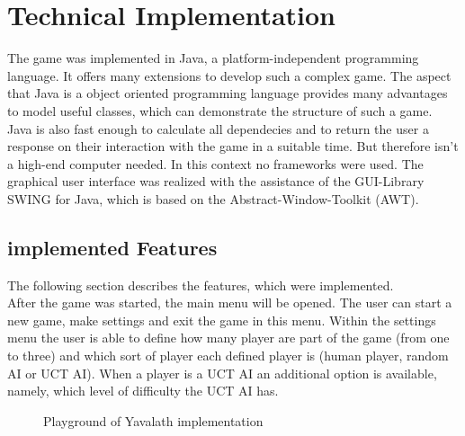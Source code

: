 \documentclass[german]{report}
\begin{document}
\chapter{Technical Implementation}
\label{sec:technImplementation}
The game was implemented in Java, a platform-independent programming language.
It offers many extensions to develop such a complex game. The aspect that Java
is a object oriented programming language provides many advantages to model
useful classes, which can demonstrate the structure of such a game. Java is also
fast enough to calculate all dependecies and to return the user a
response on their interaction with the game in a suitable time. But therefore
isn't a high-end computer needed. In this context no frameworks were used. The
graphical user interface was realized with the assistance of the GUI-Library
SWING for Java, which is based on the Abstract-Window-Toolkit (AWT).  
\section{implemented Features}
The following section describes the features, which were implemented. \\
After the game was started, the main menu will be opened. The user can start a new game, make settings and exit the game in this menu. Within the settings menu the user is able to define how many player are part of the game (from one to three) and which sort of player each defined player is (human player, random AI or UCT AI). When a player is a UCT AI an additional option is available, namely, which level of difficulty the UCT AI has.
\newpage

\begin{figure}[h]
\begin{center} 
\caption[]{Playground of Yavalath implementation}
\label{fig:playgroundOfYav}
\end{center}
\end{figure} 
\end{document}
